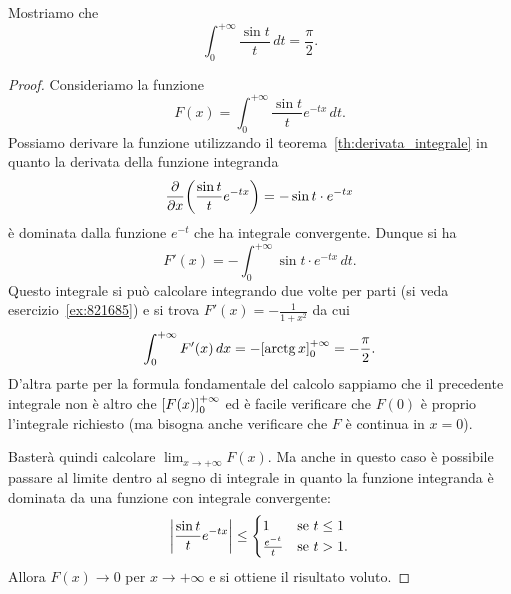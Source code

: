 \begin{exercise}
  \label{ex:integrale_sin_integrale}%
Mostriamo che 
  \[
    \int_0^{+\infty} \frac{\sin t}{t}\, dt = \frac \pi 2.
  \] 
\end{exercise}
\begin{proof}
Consideriamo la funzione 
\[
  F(x) = \int_0^{+\infty} \frac{\sin t}{t}e^{-tx}\, dt.
\]
Possiamo derivare la funzione utilizzando il teorema~\ref{th:derivata_integrale}
in quanto la derivata della funzione integranda 
\[
  \frac{\partial}{\partial x}{\left( \frac{\sin t}{t}e^{-tx} \right)} 
  = -\sin t \cdot e^{-tx}
\]
è dominata dalla funzione $e^{-t}$
che ha integrale convergente.
Dunque si ha 
\[
  F'(x) = - \int_0^{+\infty} \sin t \cdot e^{-tx}\, dt. 
\]
Questo integrale si può calcolare integrando due volte per parti 
(si veda esercizio~\ref{ex:821685}) e si trova 
$F'(x) = -\frac{1}{1+x^2}$ da cui 
\[
  \int_0^{+\infty} F'(x)\, dx = -{\left[ \operatorname{arctg} x \right]}_0^{+\infty} = - \frac \pi 2.
\]
D'altra parte per la formula fondamentale del calcolo 
sappiamo che il precedente integrale 
non è altro che ${\left[ F(x) \right]}_0^{+\infty}$ ed è facile 
verificare che $F(0)$ è proprio l'integrale richiesto 
(ma bisogna anche verificare che $F$ è continua in $x=0$).

Basterà quindi calcolare $\lim_{x\to+\infty} F(x)$.
Ma anche in questo caso è possibile passare al limite 
dentro al segno di integrale in quanto la funzione 
integranda è dominata da una funzione con integrale convergente:
\[
{\left|\frac{\sin t}{t}e^{-tx}\right|} \le 
\begin{cases}
  1 & \text{se $t\le 1$}\\
  \frac{e^{-t}}{t} & \text{se $t>1$}. 
\end{cases}
\]
Allora $F(x) \to 0$ per $x\to +\infty$ e si ottiene il risultato voluto.
\end{proof}

